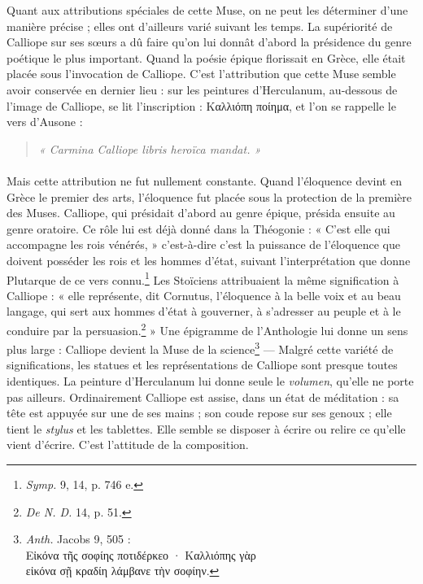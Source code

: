 \documentclass[landscape, a4paper, 11pt, oneside, polutonikogreek, french]{article}
\begin{document}
Quant aux attributions spéciales de cette Muse, on ne peut les déterminer d'une manière précise ; elles ont d'ailleurs varié suivant les temps. La supériorité de Calliope sur ses sœurs a dû faire qu'on lui donnât d'abord la présidence du genre poétique le plus important. Quand la poésie épique florissait en Grèce, elle était placée sous l'invocation de Calliope. C'est l'attribution que cette Muse semble avoir conservée en dernier lieu : sur les peintures d'Herculanum, au-dessous de l'image de Calliope, se lit l'inscription : Καλλιόπη ποίημα, et l'on se rappelle le vers d'Ausone :
\begin{quotation}
\emph{« Carmina Calliope libris heroïca mandat. »}
\end{quotation}
\paragraph{}
Mais cette attribution ne fut nullement constante. Quand l'éloquence devint en Grèce le premier des arts, l'éloquence fut placée sous la protection de la première des Muses. Calliope, qui présidait d'abord au genre épique, présida ensuite au genre oratoire. Ce rôle lui est déjà donné dans la Théogonie : « C'est elle qui accompagne les rois vénérés, » c'est-à-dire c'est la puissance de l'éloquence que doivent posséder les rois et les hommes d'état, suivant l'interprétation que donne Plutarque de ce vers connu.\footnote{\emph{Symp.} 9, 14, p. 746 e.} Les Stoïciens attribuaient la même signification à Calliope : « elle représente, dit Cornutus, l'éloquence à la belle voix et au beau langage, qui sert aux hommes d'état à gouverner, à s'adresser au peuple et à le conduire par la persuasion.\footnote{\emph{De N. D.} 14, p. 51.} » Une épigramme de l'Anthologie lui donne un sens plus large : Calliope devient la Muse de la science\footnote{\emph{Anth.} Jacobs 9, 505 :\\\hspace*{5mm}Εἰκόνα τῆς σοφίης ποτιδέρκεο · Καλλιόπης γὰρ\\\hspace*{5mm}εἰκόνα σῇ κραδίη λάμβανε τὴν σοφίην.} --- Malgré cette variété de significations, les statues et les représentations de Calliope sont presque toutes identiques. La peinture d'Herculanum lui donne seule le \emph{volumen}, qu'elle ne porte pas ailleurs. Ordinairement Calliope est assise, dans un état de méditation : sa tête est appuyée sur une de ses mains ; son coude repose sur ses genoux ; elle tient le \emph{stylus} et les tablettes. Elle semble se disposer à écrire ou relire ce qu'elle vient d'écrire. C'est l'attitude de la composition.
\clearpage
\end{document}
